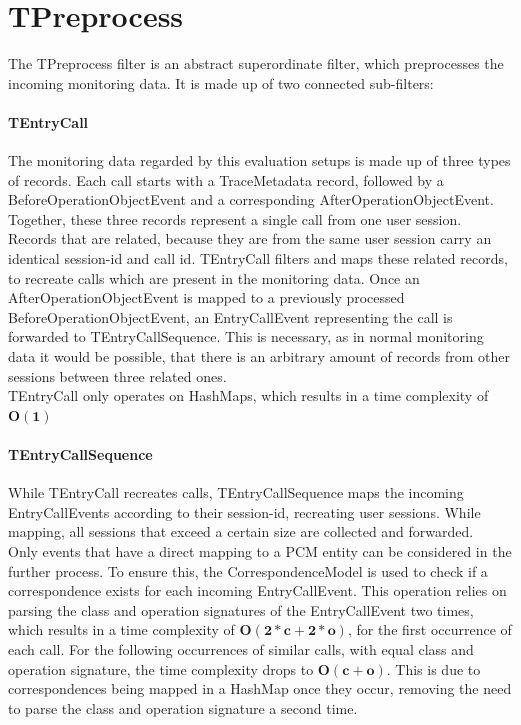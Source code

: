 \documentclass[10pt,a4paper]{article}
\begin{document}
	\section{TPreprocess}
	The TPreprocess filter is an abstract superordinate filter, which preprocesses the incoming monitoring data. It is made up of two connected sub-filters:
	
	\paragraph{TEntryCall}
	The monitoring data regarded by this evaluation setups is made up of three types of records. Each call starts with a TraceMetadata record, followed by a BeforeOperationObjectEvent and a corresponding AfterOperationObjectEvent. Together, these three records represent a single call from one user session. Records that are related, because they are from the same user session carry an identical session-id and call id. TEntryCall filters and maps these related records, to recreate calls which are present in the monitoring data. Once an AfterOperationObjectEvent is mapped to a previously processed BeforeOperationObjectEvent, an EntryCallEvent representing the call is forwarded to TEntryCallSequence. This is necessary, as in normal monitoring data it would be possible, that there is an arbitrary amount of records from other sessions between three related ones.\\
	TEntryCall only operates on HashMaps, which results in a time complexity of $\mathbf{O(1)}$
	
	\paragraph{TEntryCallSequence}
	While TEntryCall recreates calls, TEntryCallSequence maps the incoming EntryCallEvents according to their session-id, recreating user sessions. While mapping, all sessions that exceed a certain size are collected and forwarded. \\
	Only events that have a direct mapping to a PCM entity can be considered in the further process. To ensure this, the CorrespondenceModel is used to check if a correspondence exists for each incoming EntryCallEvent. This operation relies on parsing the class and operation signatures of the EntryCallEvent two times, which results in a time complexity of $\mathbf{O(2 * c + 2 * o)}$, for the first occurrence of each call. For the following occurrences of similar calls, with equal class and operation signature, the time complexity drops to $\mathbf{O(c + o)}$. This is due to correspondences being mapped in a HashMap once they occur, removing the need to parse the class and operation signature a second time.
	
\end{document}
